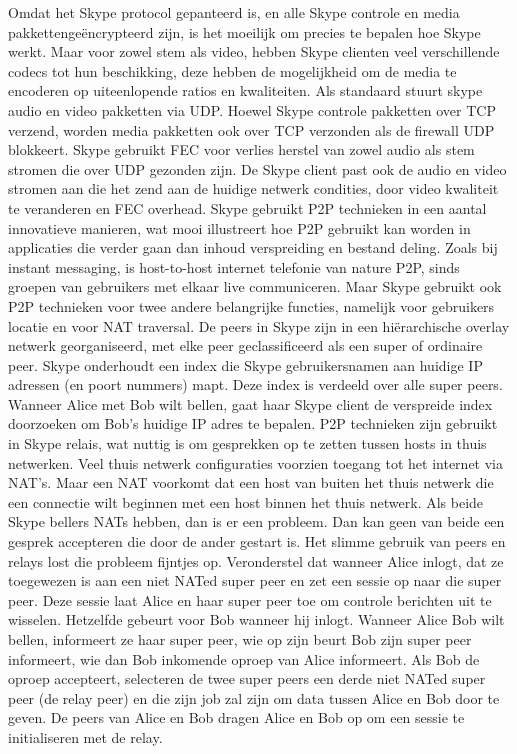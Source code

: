 Omdat het Skype protocol gepanteerd is, en alle Skype controle en media pakkettengeëncrypteerd zijn, is het moeilijk om precies te bepalen hoe Skype werkt. Maar voor zowel stem als video, hebben Skype clienten veel verschillende codecs tot hun beschikking, deze hebben de mogelijkheid om de media te encoderen op uiteenlopende ratios en kwaliteiten. Als standaard stuurt skype audio en video pakketten via UDP. Hoewel Skype controle pakketten over TCP verzend, worden media pakketten ook over TCP verzonden als de firewall UDP blokkeert. Skype gebruikt FEC voor verlies herstel van zowel audio als stem stromen die over UDP gezonden zijn. De Skype client past ook de audio en video stromen aan die het zend aan de huidige netwerk condities, door video kwaliteit te veranderen en FEC overhead.
Skype gebruikt P2P technieken in een aantal innovatieve manieren, wat mooi illustreert hoe P2P gebruikt kan worden in applicaties die verder gaan dan inhoud verspreiding en bestand deling. Zoals bij instant messaging, is host-to-host internet telefonie van nature P2P, sinds groepen van gebruikers met elkaar live communiceren. Maar Skype gebruikt ook P2P technieken voor twee andere belangrijke functies, namelijk voor gebruikers locatie en voor NAT traversal.
De peers in Skype zijn in een hiërarchische overlay netwerk georganiseerd, met elke peer geclassificeerd als een super of ordinaire peer. Skype onderhoudt een index die Skype gebruikersnamen aan huidige IP adressen (en poort nummers) mapt. Deze index is verdeeld over alle super peers. Wanneer Alice met Bob wilt bellen, gaat haar Skype client de verspreide index doorzoeken om Bob’s huidige IP adres te bepalen. P2P technieken zijn gebruikt in Skype relais, wat nuttig is om gesprekken op te zetten tussen hosts in thuis netwerken. Veel thuis netwerk configuraties voorzien toegang tot het internet via NAT’s. Maar een NAT voorkomt dat een host van buiten het thuis netwerk die een connectie wilt beginnen met een host binnen het thuis netwerk. Als beide Skype bellers NATs hebben, dan is er een probleem. Dan kan geen van beide een gesprek accepteren die door de ander gestart is. Het slimme gebruik van peers en relays lost die probleem fijntjes op.
Veronderstel dat wanneer Alice inlogt, dat ze toegewezen is aan een niet NATed super peer en zet een sessie op naar die super peer. Deze sessie laat Alice en haar super peer toe om controle berichten uit te wisselen. Hetzelfde gebeurt voor Bob wanneer hij inlogt. Wanneer Alice Bob wilt bellen, informeert ze haar super peer, wie op zijn beurt Bob zijn super peer informeert, wie dan Bob inkomende oproep van Alice informeert. Als Bob de oproep accepteert, selecteren de twee super peers een derde niet NATed super peer (de relay peer) en die zijn job zal zijn om data tussen Alice en Bob door te geven. De peers van Alice en Bob dragen Alice en Bob op om een sessie te initialiseren met de relay.
